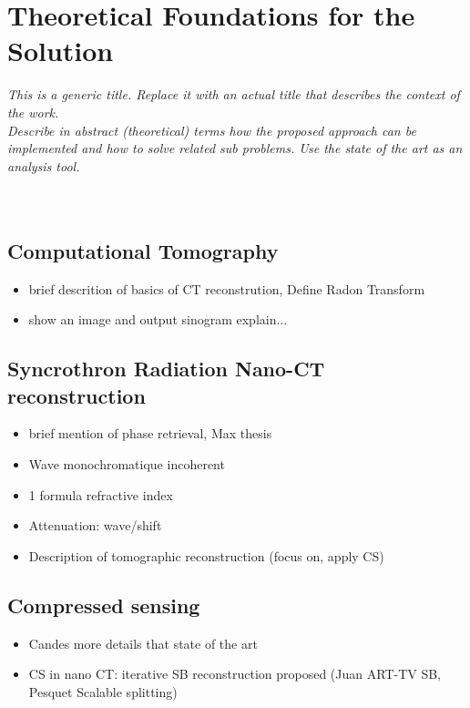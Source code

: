 \chapter{Theoretical Foundations for the Solution}
\textit{This is a generic title. Replace it with an actual title that describes the context of the work. \\
Describe in abstract (theoretical) terms how the proposed approach can be implemented and how to solve related sub problems.  Use the state of the art as an analysis tool. }\\
\\
\\
\section{Computational Tomography}
\begin{itemize}
	\item brief descrition of basics of CT reconstrution, Define Radon Transform
	\item show an image and output sinogram explain...
\end{itemize}

\section{Syncrothron Radiation Nano-CT reconstruction}
\begin{itemize}
	\item brief mention of phase retrieval, Max thesis
	\item Wave monochromatique incoherent
	\item 1 formula refractive index
	\item Attenuation: wave/shift
	
	\item Description of tomographic reconstruction (focus on, apply CS)
	
\end{itemize}

\section{Compressed sensing}
\begin{itemize}
	\item Candes more details that state of the art
	\item CS in nano CT: iterative SB reconstruction proposed (Juan ART-TV SB, Pesquet Scalable splitting)
\end{itemize}